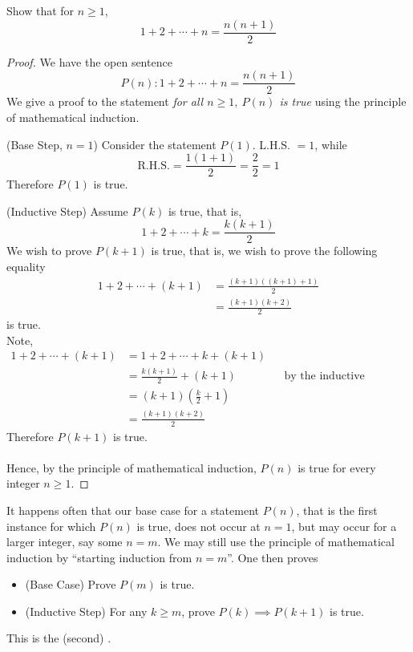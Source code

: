 \begin{example}
Show that for $n \geq 1$,
\[1 + 2 + \cdots + n = \frac{n(n+1)}{2}\]
\end{example}
\begin{proof}
We have the open sentence
\[P(n):1 + 2 + \cdots + n = \frac{n(n+1)}{2}\]
We give a proof to the statement \emph{for all $n \geq 1,\ P(n)$ is true} using the principle of mathematical induction.
\item[] (Base Step, $n = 1$) Consider the statement $P(1)$. L.H.S. $ = 1$, while
\[\mathrm{R.H.S.} = \frac{1(1 + 1)}{2} = \frac{2}{2} = 1\]
Therefore $P(1)$ is true.\\
\item[] (Inductive Step) Assume $P(k)$ is true, that is,
\[1 + 2 + \cdots + k = \frac{k(k+1)}{2}\]
We wish to prove $P(k+1)$ is true, that is, we wish to prove the following equality
\begin{align*}
1 + 2 + \cdots + (k + 1) &= \frac{(k+1)((k+1)+1)}{2}\\[1em]
 &= \frac{(k+1)(k+2)}{2}
\end{align*}
is true.\\[0.5em]
Note,
\begin{align*}
1 + 2 + \cdots + (k + 1) &= 1 + 2 + \cdots + k + (k + 1)\\[0.5em]
 &= \frac{k(k+1)}{2} + (k+1) && \text{by the inductive hypothesis}\\[0.5em]
 &= (k+1)\left(\frac{k}{2} + 1\right)\\[0.5em]
 &= \frac{(k+1)(k+2)}{2}
\end{align*}
Therefore $P(k+1)$ is true.\\
\\
Hence, by the principle of mathematical induction, $P(n)$ is true for every integer $n \geq 1$.
\end{proof}

\vspace*{1em}

\begin{discussion}
It happens often that our base case for a statement $P(n)$, that is the first instance for which $P(n)$ is true, does not occur at $n = 1$, but may occur for a larger integer, say some $n = m$. We may still use the principle of mathematical induction by ``starting induction from $n = m$''. One then proves 
\begin{itemize}
\item[](Base Case) Prove $P(m)$ is true.
\item[](Inductive Step) For any $k \geq m$, prove $P(k) \implies P(k+1)$ is true. 
\end{itemize}
This is the {\color{blue}(second)} .
\end{discussion}

